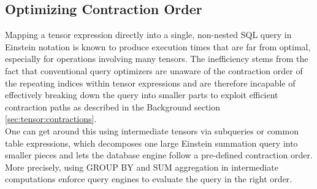 \subsection{Optimizing Contraction Order}
Mapping a tensor expression directly into a single, non-nested SQL query in Einstein 
notation is known to produce execution times that are far from optimal, especially for operations
involving many tensors. The inefficiency stems from the fact that conventional query optimizers 
are unaware of the contraction order of the repeating indices within tensor expressions and are 
therefore incapable of effectively breaking down the query into smaller parts to exploit efficient
contraction paths as described in the Background section \ref{sec:tensor:contractions}.\\
One can get around this using intermediate tensors via subqueries or common table expressions, 
which decomposes one large Einstein summation query into smaller pieces and lets the database 
engine follow a pre-defined contraction order. More precisely, using GROUP BY and SUM 
aggregation in intermediate computations enforce query engines to evaluate the query in the 
right order.

